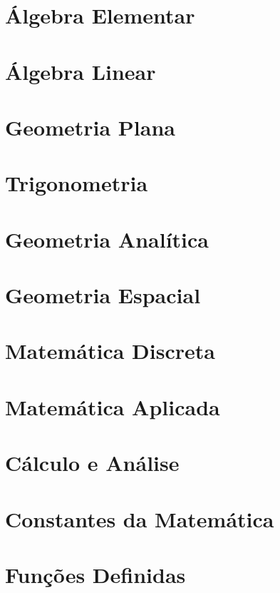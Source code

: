 \documentclass[10pt]{article} %
\begin{document}
    \section{Álgebra Elementar}
    
    \section{Álgebra Linear}
    
    \section{Geometria Plana}
    
    \section{Trigonometria}
    
    \section{Geometria Analítica}
    
    \section{Geometria Espacial}
    
    \section{Matemática Discreta}
    
    \section{Matemática Aplicada}
    
    \section{Cálculo e Análise}
    
    \section{Constantes da Matemática}
    
    \section{Funções Definidas}
    
\end{document}
